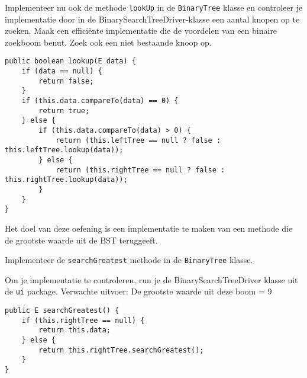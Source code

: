 \begin{oef}
\code Implementeer nu ook de methode \verb=lookUp= in de \verb=BinaryTree= klasse en controleer je implementatie door in de BinarySearchTreeDriver-klasse een aantal knopen op te zoeken. Maak een efficiënte implementatie die de voordelen van een binaire zoekboom benut. Zoek ook een niet bestaande knoop op.
\begin{opl}
\begin{lstlisting}[caption={lookUp(data) methode}, label=bstlookUp]
public boolean lookup(E data) {
	if (data == null) {
		return false;
	}
	if (this.data.compareTo(data) == 0) {
		return true;
	} else {
		if (this.data.compareTo(data) > 0) {
			return (this.leftTree == null ? false : this.leftTree.lookup(data));
		} else {
			return (this.rightTree == null ? false : this.rightTree.lookup(data));
		}
	}
}
\end{lstlisting}
\end{opl}
	
\end{oef}





\begin{oef}
\code Het doel van deze oefening is een implementatie te maken van een methode die de grootste waarde uit de BST teruggeeft.
\begin{oefenumerate}
	\item Implementeer de \verb=searchGreatest= methode in de \verb=BinaryTree= klasse. 
	\item Om je implementatie te controleren, run je de BinarySearchTreeDriver klasse uit de \verb+ui+ package. Verwachte uitvoer: De grootste waarde uit deze boom = 9 
\end{oefenumerate}
\begin{opl}
\begin{lstlisting}[caption={searchGreatest methode}, label=bstsearchgreatest]
public E searchGreatest() {
	if (this.rightTree == null) {
		return this.data;
	} else {
		return this.rightTree.searchGreatest();
	}
}
 \end{lstlisting}

\end{opl}
\end{oef}




